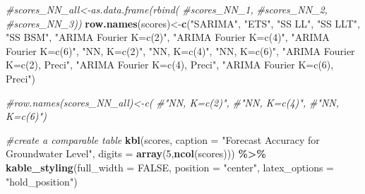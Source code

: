 \documentclass[
]{article}
\newenvironment{Shaded}{\begin{snugshade}}{\end{snugshade}}
\newcommand{\AttributeTok}[1]{\textcolor[rgb]{0.13,0.29,0.53}{#1}}
\newcommand{\CommentTok}[1]{\textcolor[rgb]{0.56,0.35,0.01}{\textit{#1}}}
\newcommand{\ConstantTok}[1]{\textcolor[rgb]{0.56,0.35,0.01}{#1}}
\newcommand{\DecValTok}[1]{\textcolor[rgb]{0.00,0.00,0.81}{#1}}
\newcommand{\FunctionTok}[1]{\textcolor[rgb]{0.13,0.29,0.53}{\textbf{#1}}}
\newcommand{\NormalTok}[1]{#1}
\newcommand{\OtherTok}[1]{\textcolor[rgb]{0.56,0.35,0.01}{#1}}
\newcommand{\SpecialCharTok}[1]{\textcolor[rgb]{0.81,0.36,0.00}{\textbf{#1}}}
\newcommand{\StringTok}[1]{\textcolor[rgb]{0.31,0.60,0.02}{#1}}
\begin{document}
\begin{Shaded}
\begin{Highlighting}[]
\CommentTok{\#scores\_NN\_all\textless{}{-}as.data.frame(rbind(}
                            \CommentTok{\#scores\_NN\_1,}
                            \CommentTok{\#scores\_NN\_2,}
                            \CommentTok{\#scores\_NN\_3))}
\FunctionTok{row.names}\NormalTok{(scores)}\OtherTok{\textless{}{-}}\FunctionTok{c}\NormalTok{(}\StringTok{"SARIMA"}\NormalTok{,}
                     \StringTok{"ETS"}\NormalTok{,}
                     \StringTok{"SS LL"}\NormalTok{,}
                     \StringTok{"SS LLT"}\NormalTok{,}
                     \StringTok{"SS BSM"}\NormalTok{,}
                     \StringTok{"ARIMA Fourier K=c(2)"}\NormalTok{,}
                     \StringTok{"ARIMA Fourier K=c(4)"}\NormalTok{,}
                     \StringTok{"ARIMA Fourier K=c(6)"}\NormalTok{,}
                     \StringTok{"NN, K=c(2)"}\NormalTok{,}
                     \StringTok{"NN, K=c(4)"}\NormalTok{,}
                     \StringTok{"NN, K=c(6)"}\NormalTok{,}
                     \StringTok{"ARIMA Fourier K=c(2), Preci"}\NormalTok{,}
                     \StringTok{"ARIMA Fourier K=c(4), Preci"}\NormalTok{,}
                     \StringTok{"ARIMA Fourier K=c(6), Preci"}\NormalTok{)}

\CommentTok{\#row.names(scores\_NN\_all)\textless{}{-}c(}
                     \CommentTok{\#"NN, K=c(2)",}
                     \CommentTok{\#"NN, K=c(4)",}
                     \CommentTok{\#"NN, K=c(6)")}

\CommentTok{\#create a comparable table }
\FunctionTok{kbl}\NormalTok{(scores, }
    \AttributeTok{caption =} \StringTok{"Forecast Accuracy for Groundwater Level"}\NormalTok{,}
    \AttributeTok{digits =} \FunctionTok{array}\NormalTok{(}\DecValTok{5}\NormalTok{,}\FunctionTok{ncol}\NormalTok{(scores))) }\SpecialCharTok{\%\textgreater{}\%}
  \FunctionTok{kable\_styling}\NormalTok{(}\AttributeTok{full\_width =} \ConstantTok{FALSE}\NormalTok{, }\AttributeTok{position =} \StringTok{"center"}\NormalTok{, }\AttributeTok{latex\_options =} \StringTok{"hold\_position"}\NormalTok{)}
\end{Highlighting}
\end{Shaded}
\end{document}
